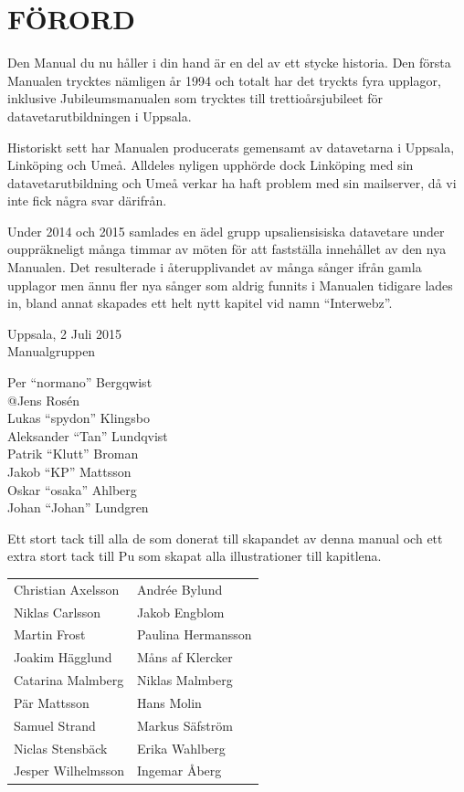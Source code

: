 \documentclass[a6paper,fontsize=10pt,twoside,open=right]{scrbook}
\begin{document}
\section{FÖRORD}
\vspace{10pt}
Den Manual du nu håller i din hand är en del av ett stycke
historia. Den första Manualen trycktes nämligen år 1994 och totalt har
det tryckts fyra upplagor, inklusive Jubileumsmanualen som trycktes
till trettioårsjubileet för datavetarutbildningen i Uppsala.

Historiskt sett har Manualen producerats gemensamt av datavetarna i
Uppsala, Linköping och Umeå. Alldeles nyligen upphörde dock Linköping
med sin datavetarutbildning och Umeå verkar ha haft problem med sin
mailserver, då vi inte fick några svar därifrån.

Under 2014 och 2015 samlades en ädel grupp upsaliensisiska datavetare
under ouppräkneligt många timmar av möten för att fastställa
innehållet av den nya Manualen. Det resulterade i återupplivandet av
många sånger ifrån gamla upplagor men ännu fler nya sånger som aldrig
funnits i Manualen tidigare lades in, bland annat skapades ett helt
nytt kapitel vid namn ``Interwebz''.\par
\vspace{10pt}
\noindent Uppsala, 2 Juli 2015\\
Manualgruppen\\
\begin{center}
  \parbox{0.47\textwidth}{
    \vspace*{-7pt}
    Per ``normano'' Bergqwist\\
    {@}Jens Rosén\\
    Lukas ``spydon'' Klingsbo\\
    Aleksander ``Tan'' Lundqvist\\
    Patrik ``Klutt'' Broman\\
    Jakob ``KP'' Mattsson\\
    Oskar ``osaka'' Ahlberg\\
    Johan ``Johan'' Lundgren}
\end{center}
\null
\vspace*{-10pt}
\newpage
Ett stort tack till alla de som donerat till skapandet av denna manual
och ett extra stort tack till Pu som skapat alla illustrationer till
kapitlena.\par
\vspace{10pt}
\begin{tabular}{@{}p{}p{}@{}}
  Christian Axelsson & Andrée Bylund\\
  Niklas Carlsson & Jakob Engblom\\
  Martin Frost & Paulina Hermansson\\
  Joakim Hägglund & Måns af Klercker\\
  Catarina Malmberg & Niklas Malmberg\\
  Pär Mattsson & Hans Molin\\
  Samuel Strand & Markus Säfström\\
  Niclas Stensbäck & Erika Wahlberg\\
  Jesper Wilhelmsson & Ingemar {\fontsize{9pt}{0pt}\selectfont Å}berg
\end{tabular}\par
\end{document}
